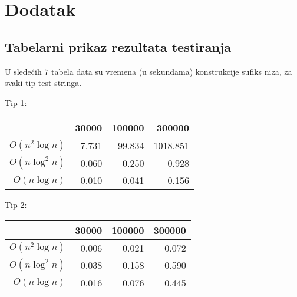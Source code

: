 \section{Dodatak}
\subsection{Tabelarni prikaz rezultata testiranja}


U slede\' cih $7$ tabela data su vremena (u sekundama) konstrukcije sufiks niza, za svaki tip test stringa.

Tip 1:

\begin{tabular}{r|r|r|r}
                & 30000 & 100000 & 300000 \\
\hline
$O(n^2 \log n)$ & 7.731 & 99.834 & 1018.851  \\
\hline
$O(n \log^2 n)$ & 0.060 & 0.250 & 0.928  \\
\hline
$O(n \log n)$ & 0.010 & 0.041 & 0.156  \\
\end{tabular}

Tip 2:

\begin{tabular}{r|r|r|r}
                & 30000 & 100000 & 300000 \\
\hline
$O(n^2 \log n)$ & 0.006& 0.021& 0.072  \\
\hline
$O(n \log^2 n)$ & 0.038& 0.158& 0.590  \\
\hline
$O(n \log n)$ & 0.016& 0.076& 0.445  \\
\end{tabular}


